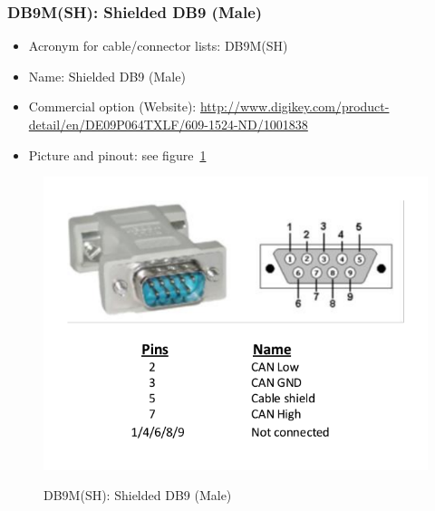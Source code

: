 \subsubsection{DB9M(SH): Shielded DB9 (Male)} \label{DEVICE:DB9M(SH)}
\begin{itemize}
  \item Acronym for cable/connector lists: DB9M(SH)
  \item Name: Shielded DB9 (Male)
  \item Commercial option (Website): \href{http://www.digikey.com/product-detail/en/DE09P064TXLF/609-1524-ND/1001838}{http://www.digikey.com/product-detail/en/DE09P064TXLF/609-1524-ND/1001838}
  \item Picture and pinout: see figure~\ref{FIG:DEVICEDB9M(SH)}
\end{itemize}
\begin{figure}
  \centering
  \includegraphics[angle=90,width=1\columnwidth]{figs/body02/FIGDEVICEDB9M(SH).pdf}\\
  \caption[DB9M(SH): Shielded DB9 (Male)]{DB9M(SH): Shielded DB9 (Male)}
  \label{FIG:DEVICEDB9M(SH)}
\end{figure}
